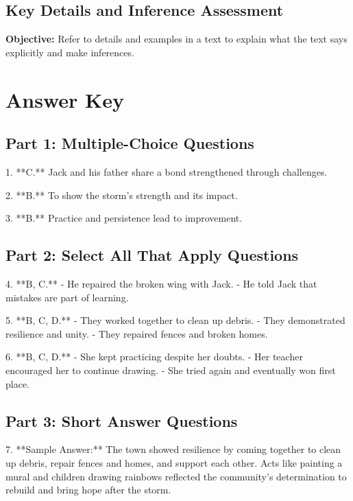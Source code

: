 \documentclass[12pt]{article}
\begin{document}
\subsection*{Key Details and Inference Assessment}
\onehalfspacing

\begin{tcolorbox}[colframe=black!40, colback=gray!0, title=Learning Objective]
\textbf{Objective:} Refer to details and examples in a text to explain what the text says explicitly and make inferences.
\end{tcolorbox}


\section*{Answer Key}

\subsection*{Part 1: Multiple-Choice Questions}

1. **C.** Jack and his father share a bond strengthened through challenges.  

2. **B.** To show the storm’s strength and its impact.  

3. **B.** Practice and persistence lead to improvement.  

\subsection*{Part 2: Select All That Apply Questions}

4. **B, C.**  
   - He repaired the broken wing with Jack.  
   - He told Jack that mistakes are part of learning.  

5. **B, C, D.**  
   - They worked together to clean up debris.  
   - They demonstrated resilience and unity.  
   - They repaired fences and broken homes.  

6. **B, C, D.**  
   - She kept practicing despite her doubts.  
   - Her teacher encouraged her to continue drawing.  
   - She tried again and eventually won first place.  

\subsection*{Part 3: Short Answer Questions}

7. **Sample Answer:** The town showed resilience by coming together to clean up debris, repair fences and homes, and support each other. Acts like painting a mural and children drawing rainbows reflected the community’s determination to rebuild and bring hope after the storm.  
\end{document}
